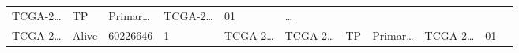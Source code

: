 \documentclass[
]{article}
\begin{document}
\begin{longtable}[]{@{}lllllllllll@{}}
\begin{minipage}[t]{0.07\columnwidth}
TCGA-2\ldots{}\strut
\end{minipage} & \begin{minipage}[t]{0.07\columnwidth}\raggedright
TP\strut
\end{minipage} & \begin{minipage}[t]{0.07\columnwidth}\raggedright
Primar\ldots{}\strut
\end{minipage} & \begin{minipage}[t]{0.09\columnwidth}\raggedright
TCGA-2\ldots{}\strut
\end{minipage} & \begin{minipage}[t]{0.10\columnwidth}\raggedright
01\strut
\end{minipage} & \begin{minipage}[t]{0.03\columnwidth}\raggedright
\ldots{}\strut
\end{minipage}\tabularnewline
\begin{minipage}[t]{0.07\columnwidth}\raggedright
TCGA-2\ldots{}\strut
\end{minipage} & \begin{minipage}[t]{0.04\columnwidth}\raggedright
Alive\strut
\end{minipage} & \begin{minipage}[t]{0.06\columnwidth}\raggedright
60226646\strut
\end{minipage} & \begin{minipage}[t]{0.07\columnwidth}\raggedright
1\strut
\end{minipage} & \begin{minipage}[t]{0.07\columnwidth}\raggedright
TCGA-2\ldots{}\strut
\end{minipage} & \begin{minipage}[t]{0.07\columnwidth}\raggedright
TCGA-2\ldots{}\strut
\end{minipage} & \begin{minipage}[t]{0.07\columnwidth}\raggedright
TP\strut
\end{minipage} & \begin{minipage}[t]{0.07\columnwidth}\raggedright
Primar\ldots{}\strut
\end{minipage} & \begin{minipage}[t]{0.09\columnwidth}\raggedright
TCGA-2\ldots{}\strut
\end{minipage} & \begin{minipage}[t]{0.10\columnwidth}\raggedright
01\strut
\end{minipage} & \begin{minipage}[t]{0.03\columnwidth}\raggedright

\end{minipage}
\end{longtable}
\end{document}
